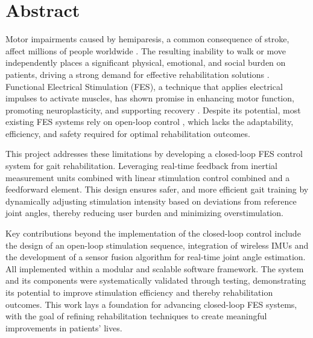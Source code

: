 
\section*{Abstract}
Motor impairments caused by hemiparesis, a common consequence of stroke, affect millions of people worldwide  \cite{noauthor_key_nodate}. The resulting inability to walk or move independently places a significant physical, emotional, and social burden on patients, driving a strong demand for effective rehabilitation solutions \cite{noauthor_physical_nodate}. Functional Electrical Stimulation (FES), a technique that applies electrical impulses to activate muscles, has shown promise in enhancing motor function, promoting neuroplasticity, and supporting recovery \cite{luo_review_2020}. Despite its potential, most existing FES systems rely on open-loop control \cite{braz_functional_2009}, which lacks the adaptability, efficiency, and safety required for optimal rehabilitation outcomes.

This project addresses these limitations by developing a closed-loop FES control system for gait rehabilitation. Leveraging real-time feedback from inertial measurement units combined with linear stimulation control combined and a feedforward element. This design ensures safer, and more efficient gait training by dynamically adjusting stimulation intensity based on deviations from reference joint angles, thereby reducing user burden and minimizing overstimulation.

Key contributions beyond the implementation of the closed-loop control include the design of an open-loop stimulation sequence, integration of wireless IMUs and the development of a sensor fusion algorithm for real-time joint angle estimation. All implemented within a modular and scalable software framework. The system and its components were systematically validated through testing, demonstrating its potential to improve stimulation efficiency and thereby rehabilitation outcomes. This work lays a foundation for advancing closed-loop FES systems, with the goal of refining rehabilitation techniques to create meaningful improvements in patients’ lives.

